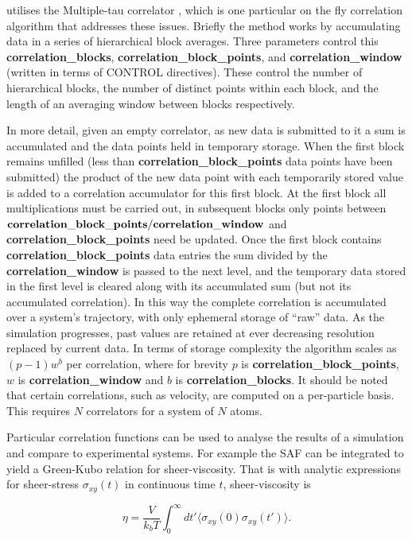 \D utilises the Multiple-tau correlator \cite{Ramirez2010Efficient}, which is one particular on the fly correlation algorithm that addresses these issues. Briefly the method works by accumulating data in a series of hierarchical block averages. Three parameters control this {\bf correlation\_blocks}, {\bf correlation\_block\_points}, and {\bf correlation\_window} (written in terms of CONTROL directives). These control the number of hierarchical blocks, the number of distinct points within each block, and the length of an averaging window between blocks respectively. 

In more detail, given an empty correlator, as new data is submitted to it a sum is accumulated and the data points held in temporary storage. When the first block remains unfilled (less than {\bf correlation\_block\_points} data points have been submitted) the product of the new data point with each temporarily stored value is added to a correlation accumulator for this first block. At the first block all multiplications must be carried out, in subsequent blocks only points between ${\bf correlation\_block\_points}/{\bf correlation\_window}$ and {\bf correlation\_block\_points} need be updated. Once the first block contains {\bf correlation\_block\_points} data entries the sum divided by the {\bf correlation\_window} is passed to the next level, and the temporary data stored in the first level is cleared along with its accumulated sum (but not its accumulated correlation). In this way the complete correlation is
accumulated over a system's trajectory, with only ephemeral storage of ``raw'' data. As the simulation progresses, past values are retained at ever decreasing resolution replaced by current data. In terms of storage complexity the algorithm scales as $(p-1)w^b$ per correlation, where for brevity $p$ is {\bf correlation\_block\_points}, $w$ is {\bf correlation\_window} and $b$ is {\bf correlation\_blocks}. It should be noted that 
certain correlations, such as velocity, are computed on a per-particle basis. This requires $N$ correlators for a system of $N$ atoms. 

Particular correlation functions can be used to analyse the results of a simulation and compare to experimental systems. For example the SAF can be integrated to yield a Green-Kubo relation for sheer-viscosity. That is with analytic expressions for sheer-stress $\sigma_{xy}(t)$ in continuous time $t$, sheer-viscosity is

\begin{equation}
    \eta = \frac{V}{k_{b}T}\int_{0}^{\infty}dt' \langle \sigma_{xy}(0)\sigma_{xy}(t')\rangle.\label{viscosity-gk}
\end{equation}


